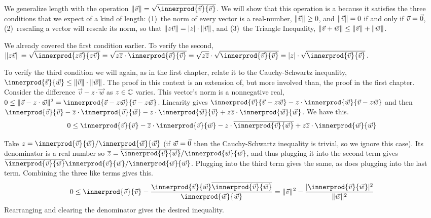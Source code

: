 \def\smashdp#1{{\setbox0=\hbox{$#1$}\dp0=0pt \box0\relax}}
We generalize length with the operation 
$\norm{\vec{v}}=\sqrt{\smashdp{\innerprod{\vec{v}}{\vec{v}}}}$.
We will show that this operation is a  
because it satisfies the
three conditions that we expect of a kind of length: 
(1)~the norm of every vector is a real-number, $\lVert\vec{v}\rVert\geq 0$, 
and $\lVert\vec{v}\rVert= 0$ if and only if $\vec{v}=\vec{0}$, 
(2)~rescaling a vector will rescale 
its norm, so that $\lVert z\vec{v}\rVert=\lvert z\rvert\cdot\lVert\vec{v}\rVert$, and 
(3)~the Triangle Inequality, 
$\lVert\vec{v}+\vec{w}\rVert\leq\lVert\vec{v}\rVert+\lVert\vec{w}\rVert$.

We already covered the first condition earlier.
To verify the second, 
$\norm{z\vec{v}}
=\sqrt{\smashdp{\innerprod{z\vec{v}}{z\vec{v}}}}
=\sqrt{\smashdp{z\compconj{z}\cdot\innerprod{\vec{v}}{\vec{v}}}}
=\sqrt{z\compconj{z}}\cdot\sqrt{\smashdp{\innerprod{\vec{v}}{\vec{v}}}}
=\absval{z}\cdot\sqrt{\smashdp{\innerprod{\vec{v}}{\vec{v}}}}$.

To verify the third condition we will again, as in the first
chapter, relate it to the Cauchy-Schwartz inequality,
$\innerprod{\vec{v}}{\vec{w}}\leq \norm{\vec{v}}\cdot\norm{\vec{w}}$.
The proof in this context is an extension of, but more involved than, the 
proof in the first chapter. 
Consider the difference $\vec{v}-z\cdot\vec{w}$ as $z\in\mathbb{C}$ varies.
This vector's norm is a nonnegative real,
$0\leq \norm{\vec{v}-z\cdot\vec{w}}^2
   =\innerprod{\vec{v}-z\vec{w}}{\vec{v}-z\vec{w}}$.
Linearity gives
$\innerprod{\vec{v}}{\vec{v}-z\vec{w}}
  -z\cdot\innerprod{\vec{w}}{\vec{v}-z\vec{w}}$
and then
$\innerprod{\vec{v}}{\vec{v}}
  -\compconj{z}\cdot\innerprod{\vec{v}}{\vec{w}}
  -z\cdot\innerprod{\vec{w}}{\vec{v}}
  +z\compconj{z}\cdot\innerprod{\vec{w}}{\vec{w}}$.
We have this.
\begin{equation*}
 0
  \leq\innerprod{\vec{v}}{\vec{v}}
  -\compconj{z}\cdot\innerprod{\vec{v}}{\vec{w}}
  -z\cdot\compconj{\innerprod{\vec{v}}{\vec{w}}}
  +z\compconj{z}\cdot\innerprod{\vec{w}}{\vec{w}}
\end{equation*}

Take 
$z=\innerprod{\vec{v}}{\vec{w}}/\innerprod{\vec{w}}{\vec{w}}$
(if $\vec{w}=\vec{0}$ then the Cauchy-Schwartz inequality is trivial, so we
ignore this case).
Its denominator is a real number so
$\compconj{z}=\compconj{\innerprod{\vec{v}}{\vec{w}}}/\innerprod{\vec{w}}{\vec{w}}$,
and thus plugging it into the second term gives 
$\compconj{\innerprod{\vec{v}}{\vec{w}}}\innerprod{\vec{v}}{\vec{w}}/\innerprod{\vec{w}}{\vec{w}}$.
Plugging into the third term gives the same,
as does plugging into the last term.
Combining the three like terms gives this.
\begin{equation*}
 0
  \leq\innerprod{\vec{v}}{\vec{v}}
  -\frac{\innerprod{\vec{v}}{\vec{w}}\compconj{\innerprod{\vec{v}}{\vec{w}}}}{\innerprod{\vec{w}}{\vec{w}}}
  =\norm{\vec{v}}^2
  -\frac{\absval{\innerprod{\vec{v}}{\vec{w}}}^2}{\norm{\vec{w}}^2}
\end{equation*}
Rearranging and clearing the denominator gives the desired 
inequality.

